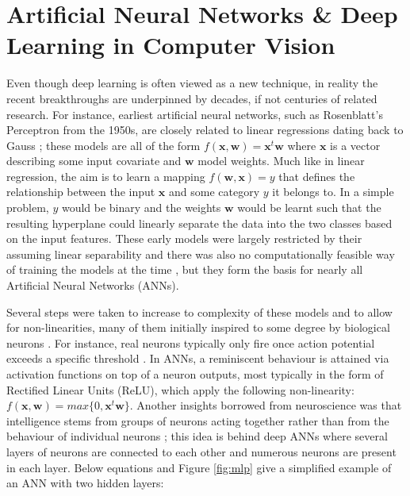\documentclass{report}
\begin{document}
\newpage

\chapter{Artificial Neural Networks \& Deep Learning in Computer Vision}

Even though deep learning is often viewed as a new technique, in reality the recent breakthroughs are underpinned by decades, if not centuries of related research. For instance, earliest artificial neural networks, such as Rosenblatt's Perceptron \cite{Rosenblatt1958} from the 1950s, are closely related to linear regressions dating back to Gauss \cite{JurgenSchmidhuber2015}; these models are all of the form $f(\mathbf{x}, \mathbf{w})=\mathbf{x}^t \mathbf{w}$ where $\mathbf{x}$ is a vector describing some input covariate and $\mathbf{w}$ model weights. Much like in linear regression, the aim is to learn a mapping $f(\mathbf{w}, \mathbf{x}) = y$ that defines the relationship between the input $\mathbf{x}$ and some category $y$ it belongs to. In a simple problem,  $y$ would be binary and the weights $\mathbf{w}$ would be learnt such that the resulting hyperplane could linearly separate the data into the two classes based on the input features. These early models were largely restricted by their assuming linear separability and there was also no computationally feasible way of training the models at the time \cite{Goodfellow2016}, \cite{JurgenSchmidhuber2015} but they form the basis for
nearly all Artificial Neural Networks (ANNs). 

Several steps were taken to increase to complexity of these models and to allow for non-linearities, many of them initially inspired to some degree by biological neurons \cite{Goodfellow16}. For instance, real neurons typically only fire once action potential exceeds a specific threshold \cite{Hodgkin1990}. In ANNs, a reminiscent behaviour is attained via activation functions on top of a neuron outputs, most typically in the form of Rectified Linear Units (ReLU), which apply the following non-linearity: $f(\mathbf{x}, \mathbf{w})=max\{0, \mathbf{x}^t \mathbf{w}\}$. Another insights borrowed from neuroscience was that intelligence stems from groups of neurons acting together rather than from the behaviour of individual neurons \cite{Goodfellow2016}; this idea is behind deep ANNs where several layers of neurons are connected to each other and numerous neurons are present in each layer. Below equations and Figure \ref{fig:mlp} give a simplified example of an ANN with two hidden layers:
\end{document}
